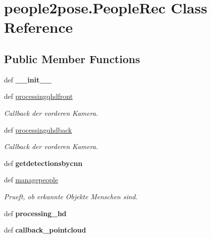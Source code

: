 \hypertarget{classpeople2pose_1_1PeopleRec}{\section{people2pose.\-People\-Rec Class Reference}
\label{classpeople2pose_1_1PeopleRec}
}
\subsection*{Public Member Functions}
\begin{DoxyCompactItemize}
\item 
\hypertarget{classpeople2pose_1_1PeopleRec_ad1219a3141dc4162820c603c1e58bfb7}{def {\bfseries \-\_\-\-\_\-init\-\_\-\-\_\-}}\label{classpeople2pose_1_1PeopleRec_ad1219a3141dc4162820c603c1e58bfb7}

\item 
def \hyperlink{classpeople2pose_1_1PeopleRec_ab902d23b67614051acfd072d73a6a5e6}{processingqhdfront}
\begin{DoxyCompactList}\small\item\em Callback der vorderen Kamera. \end{DoxyCompactList}\item 
def \hyperlink{classpeople2pose_1_1PeopleRec_a18d6ada30e36ef07a8120a64e2b0fc1a}{processingqhdback}
\begin{DoxyCompactList}\small\item\em Callback der vorderen Kamera. \end{DoxyCompactList}\item 
\hypertarget{classpeople2pose_1_1PeopleRec_a7820996039685906df0a674fd86c7689}{def {\bfseries getdetectionsbycnn}}\label{classpeople2pose_1_1PeopleRec_a7820996039685906df0a674fd86c7689}

\item 
def \hyperlink{classpeople2pose_1_1PeopleRec_a1ec343f6595ac5ba6204e94cf0d3c328}{managepeople}
\begin{DoxyCompactList}\small\item\em Prueft, ob erkannte Objekte Menschen sind. \end{DoxyCompactList}\item 
\hypertarget{classpeople2pose_1_1PeopleRec_a3ded5b9a9b302bb29e5882944b447fc0}{def {\bfseries processing\-\_\-hd}}\label{classpeople2pose_1_1PeopleRec_a3ded5b9a9b302bb29e5882944b447fc0}

\item 
\hypertarget{classpeople2pose_1_1PeopleRec_af7aa82a401458fa5e6da47538247e8e4}{def {\bfseries callback\-\_\-pointcloud}}\label{classpeople2pose_1_1PeopleRec_af7aa82a401458fa5e6da47538247e8e4}


\end{DoxyCompactItemize}
